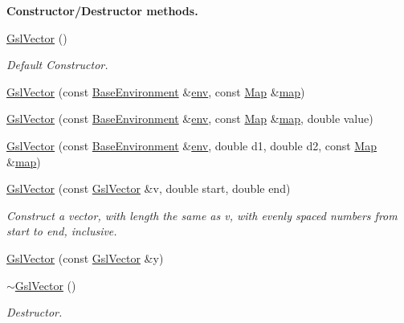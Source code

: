 \begin{Indent}{\bf Constructor/\-Destructor methods.}\par
\begin{DoxyCompactItemize}
\item 
\hyperlink{class_q_u_e_s_o_1_1_gsl_vector_a692a46459578174996732d16dd089067}{Gsl\-Vector} ()
\begin{DoxyCompactList}\small\item\em Default Constructor. \end{DoxyCompactList}\item 
\hyperlink{class_q_u_e_s_o_1_1_gsl_vector_a0319d261c759e8f85c3f76e2ce66d350}{Gsl\-Vector} (const \hyperlink{class_q_u_e_s_o_1_1_base_environment}{Base\-Environment} \&\hyperlink{class_q_u_e_s_o_1_1_vector_a2e2952dab0554fedd8dc9a2543715745}{env}, const \hyperlink{class_q_u_e_s_o_1_1_map}{Map} \&\hyperlink{class_q_u_e_s_o_1_1_vector_a0cbedc1f6e24c0ad3b688d201fd649a4}{map})
\item 
\hyperlink{class_q_u_e_s_o_1_1_gsl_vector_a80d9652ddfbd1ef87fd4ec4ab4e32231}{Gsl\-Vector} (const \hyperlink{class_q_u_e_s_o_1_1_base_environment}{Base\-Environment} \&\hyperlink{class_q_u_e_s_o_1_1_vector_a2e2952dab0554fedd8dc9a2543715745}{env}, const \hyperlink{class_q_u_e_s_o_1_1_map}{Map} \&\hyperlink{class_q_u_e_s_o_1_1_vector_a0cbedc1f6e24c0ad3b688d201fd649a4}{map}, double value)
\item 
\hyperlink{class_q_u_e_s_o_1_1_gsl_vector_a982952f763dc79ad6405d9897ca76697}{Gsl\-Vector} (const \hyperlink{class_q_u_e_s_o_1_1_base_environment}{Base\-Environment} \&\hyperlink{class_q_u_e_s_o_1_1_vector_a2e2952dab0554fedd8dc9a2543715745}{env}, double d1, double d2, const \hyperlink{class_q_u_e_s_o_1_1_map}{Map} \&\hyperlink{class_q_u_e_s_o_1_1_vector_a0cbedc1f6e24c0ad3b688d201fd649a4}{map})
\item 
\hyperlink{class_q_u_e_s_o_1_1_gsl_vector_ae60c02165e940629b14910cf9dd43d86}{Gsl\-Vector} (const \hyperlink{class_q_u_e_s_o_1_1_gsl_vector}{Gsl\-Vector} \&v, double start, double end)
\begin{DoxyCompactList}\small\item\em Construct a vector, with length the same as {\ttfamily v}, with evenly spaced numbers from {\ttfamily start} to {\ttfamily end}, inclusive. \end{DoxyCompactList}\item 
\hyperlink{class_q_u_e_s_o_1_1_gsl_vector_a6c5eb0ce11a314a4b8af2ed75fc75b30}{Gsl\-Vector} (const \hyperlink{class_q_u_e_s_o_1_1_gsl_vector}{Gsl\-Vector} \&y)
\item 
\hyperlink{class_q_u_e_s_o_1_1_gsl_vector_a0bc3734631b7dc54adbfa1ec967f2463}{$\sim$\-Gsl\-Vector} ()
\begin{DoxyCompactList}\small\item\em Destructor. \end{DoxyCompactList}\end{DoxyCompactItemize}
\end{Indent}
